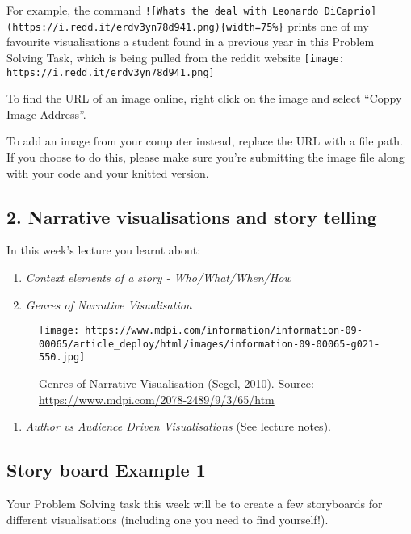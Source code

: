 \documentclass[]{article}
\providecommand{\tightlist}{%
  \setlength{\itemsep}{0pt}\setlength{\parskip}{0pt}}
\begin{document}
For example, the command
\texttt{!{[}What\textquotesingle{}s\ the\ deal\ with\ Leonardo\ DiCaprio{]}(https://i.redd.it/erdv3yn78d941.png)\{width=75\%\}}
prints one of my favourite visualisations a student found in a previous
year in this Problem Solving Task, which is being pulled from the reddit
website
\texttt{[image: https://i.redd.it/erdv3yn78d941.png]}

To find the URL of an image online, right click on the image and select
``Coppy Image Address''.

To add an image from your computer instead, replace the URL with a file
path. If you choose to do this, please make sure you're submitting the
image file along with your code and your knitted version.

\subsection{2. Narrative visualisations and story
telling}\label{narrative-visualisations-and-story-telling}

In this week's lecture you learnt about:

\begin{enumerate}
\def\labelenumi{\alph{enumi}.}
\tightlist
\item
  \emph{Context elements of a story - Who/What/When/How}
\item
  \emph{Genres of Narrative Visualisation}
\end{enumerate}

\begin{figure}
\centering
\texttt{[image: https://www.mdpi.com/information/information-09-00065/article\_deploy/html/images/information-09-00065-g021-550.jpg]}
\caption{Genres of Narrative Visualisation (Segel, 2010). Source:
\url{https://www.mdpi.com/2078-2489/9/3/65/htm}}
\end{figure}

\begin{enumerate}
\def\labelenumi{\alph{enumi}.}
\setcounter{enumi}{2}
\tightlist
\item
  \emph{Author vs Audience Driven Visualisations} (See lecture notes).
\end{enumerate}

\subsection{Story board Example 1}\label{story-board-example-1}

Your Problem Solving task this week will be to create a few storyboards
for different visualisations (including one you need to find yourself!).
\end{document}
